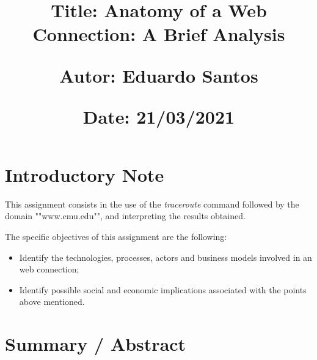 \documentclass{article}
\newcommand\tab[1][1cm]{\hspace*{#1}}
\begin{document}
\title{\vspace{-0.9cm}
       \vspace{1cm}
       \normalsize
       \raggedright\textbf{Title: \hspace{1.5cm} Anatomy of a Web Connection: A Brief Analysis} \\ \vspace{0.4cm}
       \raggedright\textbf{Autor: \hspace{1.3cm} Eduardo Santos} \\ \vspace{0.4cm}
       \raggedright\textbf{Date: \hspace{1.45cm} 21/03/2021} \\}
\author{}
\date{}

\maketitle
\thispagestyle{fancy}


\vspace{-1.4cm}

\tableofcontents


\fontsize{10pt}{13pt}
\selectfont
\lsstyle


\newpage

\section{Introductory Note}

\tab This assignment consists in the use of the \textit{traceroute} command followed by the domain ""www.cmu.edu"", and interpreting the results obtained.  

\noindent The specific objectives of this assignment are the following:

\begin{itemize}
    \item Identify the technologies, processes, actors and business models involved in an web connection;
    \item Identify possible social and economic implications associated with the points above mentioned.
\end{itemize}

\section{Summary / Abstract}
\end{document}
